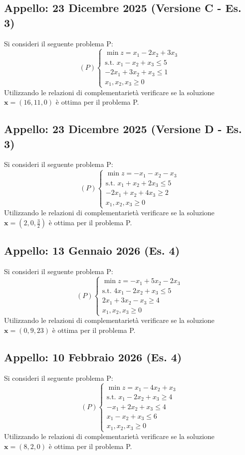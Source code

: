 \documentclass[11pt, a4paper]{article}
\begin{document}
\subsection{Appello: 23 Dicembre 2025 (Versione C - Es. 3)}
Si consideri il seguente problema P:
\[ (P) \begin{cases} \min z = x_1 - 2x_2 + 3x_3 \\ \text{s.t. } x_1 - x_2 + x_3 \le 5 \\ -2x_1 + 3x_2 + x_3 \le 1 \\ x_1, x_2, x_3 \ge 0 \end{cases} \]
Utilizzando le relazioni di complementarietà verificare se la soluzione $\mathbf{x} = (16,11,0)$ è ottima per il problema P.

\subsection{Appello: 23 Dicembre 2025 (Versione D - Es. 3)}
Si consideri il seguente problema P:
\[ (P) \begin{cases} \min z = -x_1 - x_2 - x_3 \\ \text{s.t. } x_1 + x_2 + 2x_3 \le 5 \\ -2x_1 + x_2 + 4x_3 \ge 2 \\ x_1, x_2, x_3 \ge 0 \end{cases} \]
Utilizzando le relazioni di complementarietà verificare se la soluzione $\mathbf{x} = (2,0, \frac{3}{2})$ è ottima per il problema P.

\subsection{Appello: 13 Gennaio 2026 (Es. 4)}
Si consideri il seguente problema P:
\[ (P) \begin{cases} \min z = -x_1 + 5x_2 - 2x_3 \\ \text{s.t. } 4x_1 - 2x_2 + x_3 \le 5 \\ 2x_1 + 3x_2 - x_3 \ge 4 \\ x_1, x_2, x_3 \ge 0 \end{cases} \]
Utilizzando le relazioni di complementarietà verificare se la soluzione $\mathbf{x} = (0,9,23)$ è ottima per il problema P.

\subsection{Appello: 10 Febbraio 2026 (Es. 4)}
Si consideri il seguente problema P:
\[ (P) \begin{cases} \min z = x_1 - 4x_2 + x_3 \\ \text{s.t. } x_1 - 2x_2 + x_3 \ge 4 \\ -x_1 + 2x_2 + x_3 \le 4 \\ x_1 - x_2 + x_3 \le 6 \\ x_1, x_2, x_3 \ge 0 \end{cases} \]
Utilizzando le relazioni di complementarietà verificare se la soluzione $\mathbf{x} = (8,2,0)$ è ottima per il problema P.
\end{document}
